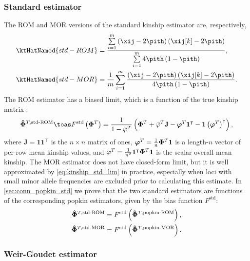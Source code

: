 \documentclass[11pt]{article}
\newcommand{\kinMat}[1][T]{%
  \ensuremath{%
    \mathbf{\Phi}^{#1}
  }%
  \xspace%
}%
\newcommand{\kinMatEstNamed}[1]{%
  \ensuremath{%
    \mathbf{\hat{\Phi}}^{T,\text{#1}}
  }%
  \xspace%
}%
\begin{document}
\subsubsection{Standard estimator}

The ROM and MOR versions of the standard kinship estimator are, respectively,
\begin{align}
  \label{eq:kinship_std_rom}
  \ktHatNamed{std-ROM}
  &=
    \frac{
    \sum\limits_{i=1}^m \left( \xij - 2 \pith \right) \left( \xij[k] - 2 \pith \right)
    }{
    \sum\limits_{i=1}^m 4 \pith \left( 1-\pith \right)
    }
    , \\
  \label{eq:kinship_std_mor}
  \ktHatNamed{std-MOR}
  &=
    \frac{1}{m} \sum\limits_{i=1}^m \frac{\left( \xij - 2 \pith \right) \left( \xij[k] - 2 \pith \right)}{4 \pith \left( 1-\pith \right)}
    .
\end{align}
The ROM estimator has a biased limit, which is a function of the true kinship matrix \citep{ochoa_estimating_2021}:
\begin{equation}
  \label{eq:kinship_std_lim}
  \kinMatEstNamed{std-ROM}
  \toas
  F^\text{std} \left( \kinMat \right)
  =
  \frac{1}{1 - \bar{\varphi}^T}
  \left(
    \kinMat
    + \bar{\varphi}^T \mathbf{J}
    - \boldsymbol{\varphi}^T \mathbf{1}^\intercal 
    - \mathbf{1} \left( \boldsymbol{\varphi}^T \right)^\intercal 
  \right)
  ,
\end{equation}
where
$\mathbf{J} = \mathbf{1} \mathbf{1}^\intercal$ is the $n \times n$ matrix of ones,
$\boldsymbol{\varphi}^T = \frac{1}{n} \kinMat \mathbf{1}$ is a length-$n$ vector of per-row mean kinship values, and
$\bar{\varphi}^T = \frac{1}{n^2} \mathbf{1}^\intercal \kinMat \mathbf{1}$ is the scalar overall mean kinship.
The MOR estimator does not have closed-form limit, but it is well approximated by \cref{eq:kinship_std_lim} in practice, especially when loci with small minor allele frequencies are excluded prior to calculating this estimate.
In \cref{sec:conn_popkin_std} we prove that the two standard estimators are functions of the corresponding popkin estimators, given by the bias function $F^\text{std}$:
\begin{align*}
  \kinMatEstNamed{std-ROM}
  &=
    F^\text{std} \left( \kinMatEstNamed{popkin-ROM} \right)
    , \\
  \kinMatEstNamed{std-MOR}
  &=
    F^\text{std} \left( \kinMatEstNamed{popkin-MOR} \right)
    .
\end{align*}

\subsubsection{Weir-Goudet estimator}
\end{document}
